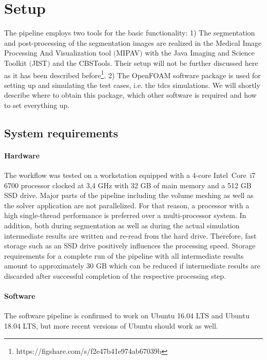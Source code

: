 \section{Setup}
The pipeline employs two tools for the basic functionality: 1) The segmentation and post-processing of the segmentation images
are realized in the Medical Image Processing And Visualization tool $($MIPAV$)$ \cite{mcauliffe2001medical} with the Java Imaging
and Science Toolkit $($JIST$)$ \cite{lucas2010java} and the CBSTools. Their setup will not be further discussed here as it has
been described before\footnote{https://figshare.com/s/f2e47b41e974ab67039b}\cite{kalloch2018semi}. 2) The OpenFOAM software
package is used for setting up and simulating the test cases, i.e. the tdcs simulations. We will shortly describe where to obtain
this package, which other software is required and how to set everything up.

\subsection{System requirements}
\paragraph{Hardware}
The workflow was tested on a workstation equipped with a 4-core Intel\textsuperscript{\textregistered}~Core\texttrademark~i7 6700
processor clocked at 3,4 GHz with 32 GB of main memory and a 512 GB SSD drive. Major parts of the pipeline including the volume
meshing as well as the solver application are not parallelized. For that reason, a processor with a high single-thread performance
is preferred over a multi-processor system. In addition, both during segmentation as well as during the actual simulation intermediate
results are written and re-read from the hard drive. Therefore, fast storage such as an SSD drive positively influences the
processing speed. Storage requirements for a complete run of the pipeline with all intermediate results amount to approximately
30 GB which can be reduced if intermediate results are discarded after successful completion of the respective processing step.

\paragraph{Software}
The software pipeline is confirmed to work on Ubuntu 16.04 LTS and Ubuntu 18.04 LTS, but more recent versions of Ubuntu should
work as well.

